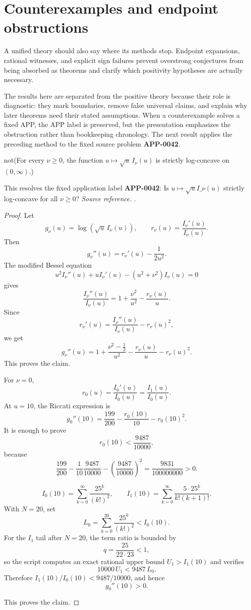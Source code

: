 \section{Counterexamples and endpoint obstructions}
A unified theory should also say where its methods stop.  Endpoint expansions, rational witnesses, and explicit sign failures prevent overstrong conjectures from being absorbed as theorems and clarify which positivity hypotheses are actually necessary.

The results here are separated from the positive theory because their role is diagnostic: they mark boundaries, remove false universal claims, and explain why later theorems need their stated assumptions.  When a counterexample solves a fixed APP, the APP label is preserved, but the presentation emphasizes the obstruction rather than bookkeeping chronology.
The next result applies the preceding method to the fixed source problem \textbf{APP-0042}.
\begin{counterexample}
\label{res:not-bessel-i-sqrt-log-concavity-nu-ge-0}
not(For every \(\nu\ge0\), the function \(u\mapsto \sqrt{u}\,I_\nu(u)\) is strictly log-concave on \((0,\infty)\).)

This resolves the fixed application label \textbf{APP-0042}: Is \(u\mapsto \sqrt{u}I\_\nu(u)\) strictly log-concave for all \(\nu\ge0\)?
\emph{Source reference.} \cite{app-app-0042-source}.
\end{counterexample}
\begin{proof}
Let
\[
g_\nu(u)=\log(\sqrt u\,I_\nu(u)),
\qquad
r_\nu(u)=\frac{I_\nu'(u)}{I_\nu(u)}.
\]
Then
\[
g_\nu''(u)=r_\nu'(u)-\frac{1}{2u^2}.
\]
The modified Bessel equation
\[
u^2I_\nu''(u)+uI_\nu'(u)-(u^2+\nu^2)I_\nu(u)=0
\]
gives
\[
\frac{I_\nu''(u)}{I_\nu(u)}
=1+\frac{\nu^2}{u^2}-\frac{r_\nu(u)}{u}.
\]
Since
\[
r_\nu'(u)=\frac{I_\nu''(u)}{I_\nu(u)}-r_\nu(u)^2,
\]
we get
\[
g_\nu''(u)
=
1+\frac{\nu^2-\frac12}{u^2}
-\frac{r_\nu(u)}{u}
-r_\nu(u)^2.
\]
This proves the claim.

For \(\nu=0\),
\[
r_0(u)=\frac{I_0'(u)}{I_0(u)}=\frac{I_1(u)}{I_0(u)}.
\]
At \(u=10\), the Riccati expression is
\[
g_0''(10)=\frac{199}{200}-\frac{r_0(10)}{10}-r_0(10)^2.
\]
It is enough to prove
\[
r_0(10)<\frac{9487}{10000},
\]
because
\[
\frac{199}{200}
-\frac{1}{10}\frac{9487}{10000}
-\left(\frac{9487}{10000}\right)^2
=\frac{9831}{100000000}>0.
\]

\[
I_0(10)=\sum_{k=0}^{\infty}\frac{25^k}{(k!)^2},
\qquad
I_1(10)=\sum_{k=0}^{\infty}\frac{5\cdot25^k}{k!(k+1)!}.
\]
With \(N=20\), set
\[
L_0=\sum_{k=0}^{20}\frac{25^k}{(k!)^2}<I_0(10).
\]
For the \(I_1\) tail after \(N=20\), the term ratio is bounded by
\[
q=\frac{25}{22\cdot23}<1,
\]
so the script computes an exact rational upper bound \(U_1>I_1(10)\) and verifies
\[
10000\,U_1<9487\,L_0.
\]
Therefore \(I_1(10)/I_0(10)<9487/10000\), and hence
\[
g_0''(10)>0.
\]

This proves the claim.
\end{proof}

